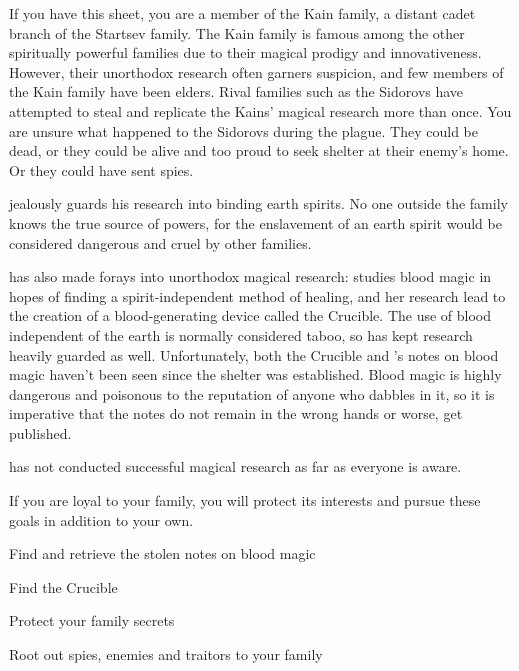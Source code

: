 \documentclass[blue]{Pestilence}
\begin{document}
\name{\bKain{}}

If you have this sheet, you are a member of the Kain family, a distant cadet branch of the Startsev family. The Kain family is famous among the other spiritually powerful families due to their magical prodigy and innovativeness. However, their unorthodox research often garners suspicion, and few members of the Kain family have been elders. Rival families such as the Sidorovs have attempted to steal and replicate the Kains' magical research more than once. You are unsure what happened to the Sidorovs during the plague. They could be dead, or they could be alive and too proud to seek shelter at their enemy's home. Or they could have sent spies.

\cElder{\intro} jealously guards his research into binding earth spirits. No one outside the family knows the true source of \cElder{\their} powers, for the enslavement of an earth spirit would be considered dangerous and cruel by other families.

\cRebel{\intro} has also made forays into unorthodox magical research: \cRebel{\they} studies blood magic in hopes of finding a spirit-independent method of healing, and her research lead to the creation of a blood-generating device called the Crucible. The use of blood independent of the earth is normally considered taboo, so \cRebel{\they} has kept \cRebel{\their} research heavily guarded as well. Unfortunately, both the Crucible and \cRebel{}'s notes on blood magic haven't been seen since the shelter was established. Blood magic is highly dangerous and poisonous to the reputation of anyone who dabbles in it, so it is imperative that the notes do not remain in the wrong hands or worse, get published.

\cApprentice{\intro} has not conducted successful magical research as far as everyone is aware.

If you are loyal to your family, you will protect its interests and pursue these goals in addition to your own. 

\begin{itemz}[Goals]
	\item Find and retrieve the stolen notes on blood magic
 \item Find the Crucible
 \item Protect your family secrets
 \item Root out spies, enemies and traitors to your family
\end{itemz}
\end{document}
